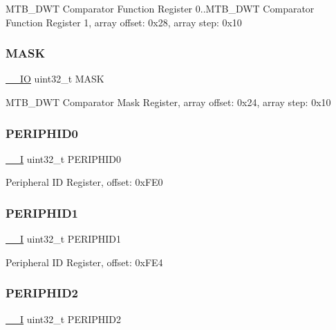 M\+T\+B\+\_\+\+D\+WT Comparator Function Register 0..M\+T\+B\+\_\+\+D\+WT Comparator Function Register 1, array offset\+: 0x28, array step\+: 0x10 \mbox{\label{struct_m_t_b_d_w_t___type_a5c955643593b4aedbe9f84f054d26522}} 
\subsubsection{\texorpdfstring{MASK}{MASK}}
{\footnotesize\ttfamily \mbox{\hyperlink{core__cm0plus_8h_aec43007d9998a0a0e01faede4133d6be}{\+\_\+\+\_\+\+IO}} uint32\+\_\+t M\+A\+SK}

M\+T\+B\+\_\+\+D\+WT Comparator Mask Register, array offset\+: 0x24, array step\+: 0x10 \mbox{\label{struct_m_t_b_d_w_t___type_abccabeeb775d571ffd814f5d21937eab}} 
\subsubsection{\texorpdfstring{PERIPHID0}{PERIPHID0}}
{\footnotesize\ttfamily \mbox{\hyperlink{core__cm0plus_8h_af63697ed9952cc71e1225efe205f6cd3}{\+\_\+\+\_\+I}} uint32\+\_\+t P\+E\+R\+I\+P\+H\+I\+D0}

Peripheral ID Register, offset\+: 0x\+F\+E0 \mbox{\label{struct_m_t_b_d_w_t___type_a16ec4a15479493f070d74c29f4e244c5}} 
\subsubsection{\texorpdfstring{PERIPHID1}{PERIPHID1}}
{\footnotesize\ttfamily \mbox{\hyperlink{core__cm0plus_8h_af63697ed9952cc71e1225efe205f6cd3}{\+\_\+\+\_\+I}} uint32\+\_\+t P\+E\+R\+I\+P\+H\+I\+D1}

Peripheral ID Register, offset\+: 0x\+F\+E4 \mbox{\label{struct_m_t_b_d_w_t___type_a94da77c610b86d788d32cc8cb6871d23}} 
\subsubsection{\texorpdfstring{PERIPHID2}{PERIPHID2}}
{\footnotesize\ttfamily \mbox{\hyperlink{core__cm0plus_8h_af63697ed9952cc71e1225efe205f6cd3}{\+\_\+\+\_\+I}} uint32\+\_\+t P\+E\+R\+I\+P\+H\+I\+D2}

